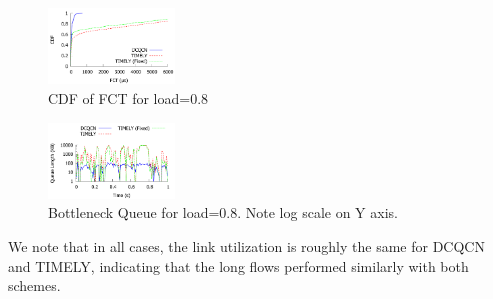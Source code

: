 \begin{figure}[t]
\center
\includegraphics[width=0.3\textwidth]{figures/fct_cdf.pdf}
\caption{CDF of FCT for load=0.8}
\label{fig:fct_cdf}
\end{figure}

\begin{figure}[t]
\center
\includegraphics[width=0.3\textwidth]{figures/fct_queue.pdf}
\caption{Bottleneck Queue for load=0.8. Note log scale on Y axis.}
\label{fig:fct_queue}
\end{figure}
\fi

We note that in all cases, the link utilization is roughly the same for DCQCN
and TIMELY, indicating that the long flows performed similarly with both
schemes.

